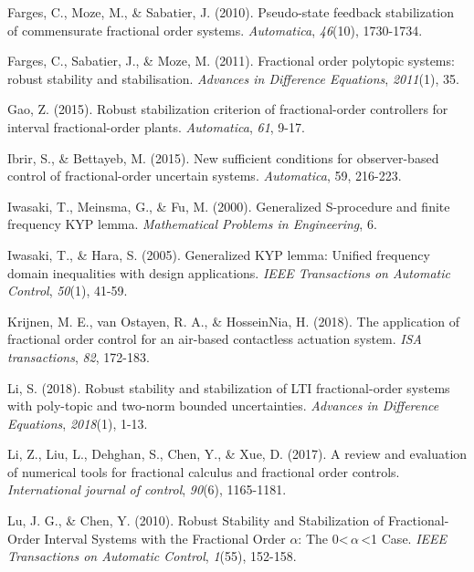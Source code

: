 \documentclass[]{interact}
\theoremstyle{plain}%
\theoremstyle{definition}
\theoremstyle{remark}
\begin{document}
\begin{thebibliography}{}
	Farges, C., Moze, M., \& Sabatier, J. (2010). Pseudo-state feedback stabilization of commensurate fractional order systems. \emph{Automatica}, \emph{46}(10), 1730-1734.
	
	Farges, C., Sabatier, J., \& Moze, M. (2011). Fractional order polytopic systems: robust stability and stabilisation. \emph{Advances in Difference Equations}, \emph{2011}(1), 35.
	
	Gao, Z. (2015). Robust stabilization criterion of fractional-order controllers for interval fractional-order plants. \emph{Automatica}, \emph{61}, 9-17.
	
	Ibrir, S., \& Bettayeb, M. (2015). New sufficient conditions for observer-based control of fractional-order uncertain systems. \emph{Automatica}, 59, 216-223.
	
	Iwasaki, T., Meinsma, G., \& Fu, M. (2000). Generalized S-procedure and finite frequency KYP lemma. \emph{Mathematical Problems in Engineering}, 6.
	
	Iwasaki, T., \& Hara, S. (2005). Generalized KYP lemma: Unified frequency domain inequalities with design applications. \emph{IEEE Transactions on Automatic Control}, \emph{50}(1), 41-59.
	
	Krijnen, M. E., van Ostayen, R. A., \& HosseinNia, H. (2018). The application of fractional order control for an air-based contactless actuation system. \emph{ISA transactions}, \emph{82}, 172-183.
	
	Li, S. (2018). Robust stability and stabilization of LTI fractional-order systems with poly-topic and two-norm bounded uncertainties. \emph{Advances in Difference Equations}, \emph{2018}(1), 1-13.
	
	Li, Z., Liu, L., Dehghan, S., Chen, Y., \& Xue, D. (2017). A review and evaluation of numerical tools for fractional calculus and fractional order controls. \emph{International journal of control}, \emph{90}(6), 1165-1181.
	
	Lu, J. G., \& Chen, Y. (2010). Robust Stability and Stabilization of Fractional-Order Interval Systems with the Fractional Order $\alpha $: The  0\textless\,$\alpha$\,\textless1 Case. \emph{IEEE Transactions on Automatic Control}, \emph{1}(55), 152-158.
	

\end{thebibliography}
\end{document}

